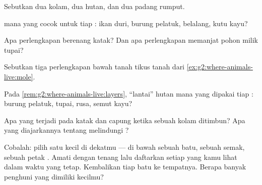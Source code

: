 \begin{exercise}[$\star$]\label{exo:g2:where-animals-live:2}
Sebutkan dua  kolam, dua  hutan, dan dua  padang
rumput.
\end{exercise}

\begin{exercise}[$\star$]\label{exo:g2:where-animals-live:3}
 mana yang cocok untuk tiap : ikan duri, burung pelatuk,
belalang, kutu kayu?
\end{exercise}

\begin{exercise}[$\star$]\label{exo:g2:where-animals-live:4}
Apa perlengkapan berenang katak? Dan apa perlengkapan memanjat pohon
milik tupai?
\end{exercise}

\begin{exercise}[$\star$]\label{exo:g2:where-animals-live:5}
Sebutkan tiga perlengkapan bawah tanah tikus tanah dari
\cref{ex:g2:where-animals-live:mole}.
\end{exercise}

\begin{exercise}[$\star$]\label{exo:g2:where-animals-live:6}
Pada \cref{rem:g2:where-animals-live:layers}, ``lantai'' hutan mana
yang dipakai tiap : burung pelatuk, tupai, rusa, semut kayu?
\end{exercise}

\begin{exercise}[$\star$]\label{exo:g2:where-animals-live:7}
Apa yang terjadi pada katak dan capung ketika sebuah kolam ditimbun?
Apa yang diajarkannya tentang melindungi ?
\end{exercise}

\begin{exercise}[$\star$]\label{exo:g2:where-animals-live:8}
Cobalah: pilih satu  kecil di dekatmu --- di bawah sebuah batu,
sebuah semak, sebuah petak . Amati dengan tenang lalu daftarkan
setiap  yang kamu lihat dalam waktu yang tetap. Kembalikan tiap
batu ke tempatnya. Berapa banyak penghuni yang dimiliki 
kecilmu?
\end{exercise}

